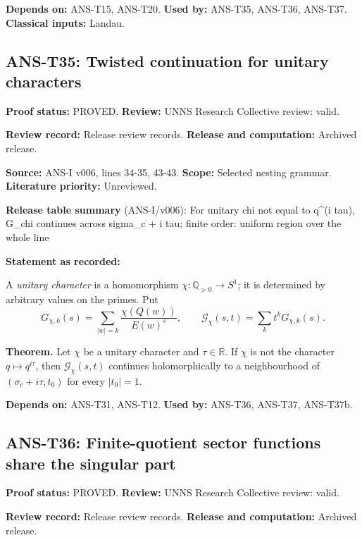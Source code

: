 \documentclass[
  11pt,
]{article}
\begin{document}
\textbf{Depends on:} ANS-T15, ANS-T20. \textbf{Used by:} ANS-T35,
ANS-T36, ANS-T37. \textbf{Classical inputs:} Landau.

\hypertarget{ans-t35-twisted-continuation-for-unitary-characters}{%
\subsection{ANS-T35: Twisted continuation for unitary
characters}\label{ans-t35-twisted-continuation-for-unitary-characters}}

\textbf{Proof status:} PROVED. \textbf{Review:} UNNS Research Collective
review: valid.

\textbf{Review record:} Release review records. \textbf{Release and
computation:} Archived release.

\textbf{Source:} ANS-I v006, lines 34-35, 43-43. \textbf{Scope:}
Selected nesting grammar. \textbf{Literature priority:} Unreviewed.

\textbf{Release table summary} (ANS-I/v006): For unitary chi not equal
to q\^{}(i tau), G\_chi continues across sigma\_c + i tau; finite order:
uniform region over the whole line

\textbf{Statement as recorded:}

A \emph{unitary character} is a homomorphism
\(\chi:\mathbb Q_{>0}\to S^1\); it is determined by arbitrary values on
the primes. Put
\[G_{\chi,k}(s)=\sum_{|w|=k}\frac{\chi(Q(w))}{E(w)^s},\qquad\mathcal G_\chi(s,t)=\sum_kt^kG_{\chi,k}(s).\]

\textbf{Theorem.} Let \(\chi\) be a unitary character and
\(\tau\in\mathbb R\). If \(\chi\) is not the character
\(q\mapsto q^{i\tau}\), then \(\mathcal G_\chi(s,t)\) continues
holomorphically to a neighbourhood of \((\sigma_c+i\tau,t_0)\) for every
\(|t_0|=1\).

\textbf{Depends on:} ANS-T31, ANS-T12. \textbf{Used by:} ANS-T36,
ANS-T37, ANS-T37b.

\hypertarget{ans-t36-finite-quotient-sector-functions-share-the-singular-part}{%
\subsection{ANS-T36: Finite-quotient sector functions share the singular
part}\label{ans-t36-finite-quotient-sector-functions-share-the-singular-part}}

\textbf{Proof status:} PROVED. \textbf{Review:} UNNS Research Collective
review: valid.

\textbf{Review record:} Release review records. \textbf{Release and
computation:} Archived release.
\end{document}
